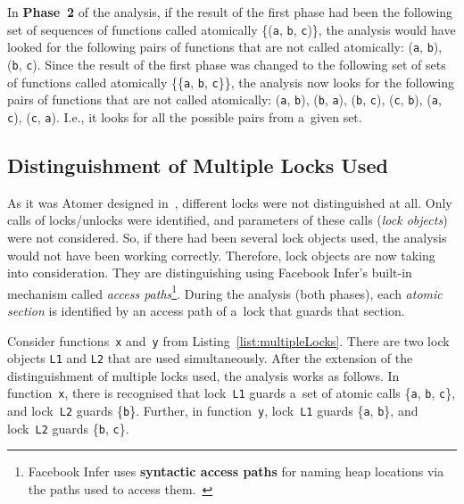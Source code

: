 \begin{example}
    In \textbf{Phase~2} of the analysis, if the result of the first phase
    had been the following set of sequences of functions called atomically
    \{(\texttt{a}, \texttt{b}, \texttt{c})\}, the analysis would have looked
    for the following pairs of functions that are not called atomically:
    (\texttt{a}, \texttt{b}), (\texttt{b}, \texttt{c}). Since the result
    of the first phase was changed to the following set of sets of
    functions called atomically \{\{\texttt{a}, \texttt{b}, \texttt{c}\}\},
    the analysis now looks for the following pairs of functions that are
    not called atomically: (\texttt{a}, \texttt{b}), (\texttt{b},
    \texttt{a}), (\texttt{b}, \texttt{c}), (\texttt{c}, \texttt{b}),
    (\texttt{a}, \texttt{c}), (\texttt{c}, \texttt{a}). I.e., it looks
    for all the possible pairs from a~given set.
\end{example}

\subsection{Distinguishment of Multiple Locks Used}

As it was Atomer designed in~\cite{harmimBP}, different locks were not
distinguished at all. Only calls of locks/unlocks were identified, and
parameters of these calls (\emph{lock objects}) were not considered. So,
if there had been several lock objects used, the analysis would not have
been working correctly. Therefore, lock objects are now taking into
consideration. They are distinguishing using Facebook Infer's built-in
mechanism called \emph{access paths}\footnote{Facebook Infer uses
\textbf{syntactic access paths} for naming heap locations via the paths used
to access them.~\cite{racerD}}. During the analysis (both phases), each
\emph{atomic section} is identified by an access path of a~lock that
guards that section.

\begin{example}
    Consider functions~\texttt{x} and~\texttt{y} from
    Listing~\ref{list:multipleLocks}. There are two lock objects
    \texttt{L1} and \texttt{L2} that are used simultaneously.
    After the extension of the distinguishment of multiple locks used, the
    analysis works as follows. In function~\texttt{x}, there is recognised
    that lock~\texttt{L1} guards a~set of atomic calls \{\texttt{a},
    \texttt{b}, \texttt{c}\}, and lock~\texttt{L2} guards \{\texttt{b}\}.
    Further, in function~\texttt{y}, lock~\texttt{L1} guards \{\texttt{a},
    \texttt{b}\}, and lock~\texttt{L2} guards \{\texttt{b}, \texttt{c}\}.
\end{example}

